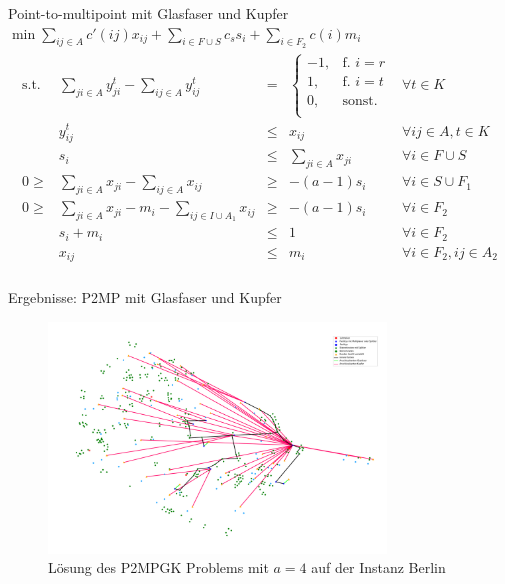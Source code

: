\documentclass{beamer}
\begin{document}
\begin{frame}{Point-to-multipoint mit Glasfaser und Kupfer}
	  $\min \displaystyle\sum_{ij \in A} c'(ij) x_{ij} + \displaystyle\sum_{i \in F \cup S} c_s s_i + \displaystyle\sum_{i \in F_2} c(i) m_i$
	  \begin{align*}
	  \begin{array}{ccrcl}
	  \textrm{s.t.}  
	   &\displaystyle\sum_{ji \in A} y_{ji}^t - \displaystyle\sum_{ij \in A} y_{ij}^t& = & \left\{\begin{array}{cl} 
	  -1, & \text{f. } i=r\\ 
	  1, & \text{f. } i=t\\ 
	  0, & \text{sonst.}\\ 
	  \end{array}
	  \right. & \forall t \in K \\
	  & y_{ij}^t & \leq & x_{ij} & \forall ij \in A, t\in K \\
	  & s_i &\leq& \displaystyle\sum_{ji \in A} x_{ji}& \forall  i \in F \cup S \\ 
	  0\geq&\displaystyle\sum_{ji \in A} x_{ji} - \displaystyle\sum_{ij \in A} x_{ij}&\geq& -(a-1)s_i & \forall i \in S \cup F_1\\
	  0\geq&\displaystyle\sum_{ji \in A} x_{ji} -m_i - \displaystyle\sum_{ij \in I \cup A_1} x_{ij}&\geq& -(a-1)s_i & \forall i \in F_2\\
	  &s_i+m_i & \leq & 1 & \forall i \in F_2 \\
	  &x_{ij}& \leq & m_i & \forall i \in F_2, ij \in A_2 \\
	  \end{array}
	  \end{align*}
\end{frame}

\begin{frame}{Ergebnisse: P2MP mit Glasfaser und Kupfer}
	\begin{figure}[!htbp]
		\centering
				\includegraphics[width=0.8\textwidth]{./Bilder/P2MPGK_Berlin_demand1_duration0}
				\caption{L\"osung des P2MPGK Problems mit \(a = 4\) auf der Instanz Berlin}
				\label{p2mpgk_b_pic_sn4}
	\end{figure}
\end{frame}
\end{document}

